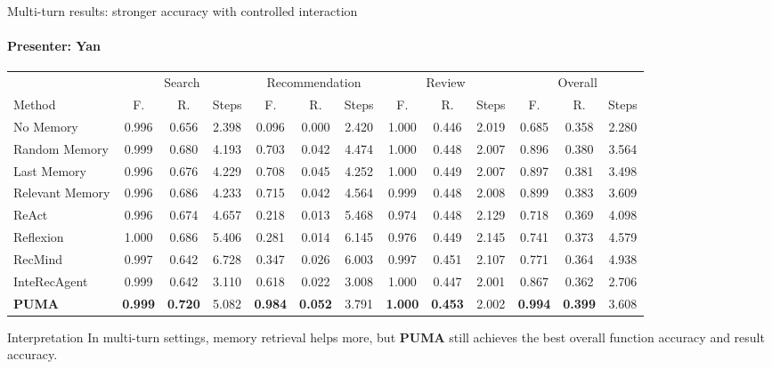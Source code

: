 \documentclass[10pt]{beamer}
\newcommand{\speaker}[1]{\framesubtitle{Presenter: #1}}
\begin{document}
\begin{frame}{Multi-turn results: stronger accuracy with controlled interaction}
  \speaker{Yan}
  \scriptsize
  \begin{adjustbox}{max width=\linewidth}
  \begin{tabular}{@{}lccc|ccc|ccc|ccc@{}}
    \toprule
    & \multicolumn{3}{c|}{Search} & \multicolumn{3}{c|}{Recommendation} & \multicolumn{3}{c|}{Review} & \multicolumn{3}{c}{Overall} \\
    Method & F. & R. & Steps & F. & R. & Steps & F. & R. & Steps & F. & R. & Steps \\
    \midrule
    No Memory & 0.996 & 0.656 & 2.398 & 0.096 & 0.000 & 2.420 & 1.000 & 0.446 & 2.019 & 0.685 & 0.358 & 2.280 \\
    Random Memory & 0.999 & 0.680 & 4.193 & 0.703 & 0.042 & 4.474 & 1.000 & 0.448 & 2.007 & 0.896 & 0.380 & 3.564 \\
    Last Memory & 0.996 & 0.676 & 4.229 & 0.708 & 0.045 & 4.252 & 1.000 & 0.449 & 2.007 & 0.897 & 0.381 & 3.498 \\
    Relevant Memory & 0.996 & 0.686 & 4.233 & 0.715 & 0.042 & 4.564 & 0.999 & 0.448 & 2.008 & 0.899 & 0.383 & 3.609 \\
    ReAct & 0.996 & 0.674 & 4.657 & 0.218 & 0.013 & 5.468 & 0.974 & 0.448 & 2.129 & 0.718 & 0.369 & 4.098 \\
    Reflexion & 1.000 & 0.686 & 5.406 & 0.281 & 0.014 & 6.145 & 0.976 & 0.449 & 2.145 & 0.741 & 0.373 & 4.579 \\
    RecMind & 0.997 & 0.642 & 6.728 & 0.347 & 0.026 & 6.003 & 0.997 & 0.451 & 2.107 & 0.771 & 0.364 & 4.938 \\
    InteRecAgent & 0.999 & 0.642 & 3.110 & 0.618 & 0.022 & 3.008 & 1.000 & 0.447 & 2.001 & 0.867 & 0.362 & 2.706 \\
    \textbf{PUMA} & \textbf{0.999} & \textbf{0.720} & 5.082 & \textbf{0.984} & \textbf{0.052} & 3.791 & \textbf{1.000} & \textbf{0.453} & 2.002 & \textbf{0.994} & \textbf{0.399} & 3.608 \\
    \bottomrule
  \end{tabular}
  \end{adjustbox}
  \vspace{0.35em}
  \begin{block}{Interpretation}
    \small In multi-turn settings, memory retrieval helps more, but \textbf{PUMA} still achieves the best overall function accuracy and result accuracy.
  \end{block}
\end{frame}
\end{document}

